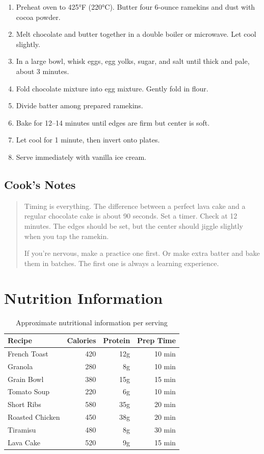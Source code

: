 \documentclass[
    language=english,
    doctype=recipe-book,
    institution=none,
]{../../omnilatex}
\begin{document}
\begin{enumerate}
    \item Preheat oven to 425°F (220°C). Butter four 6-ounce ramekins and dust with cocoa powder.
    \item Melt chocolate and butter together in a double boiler or microwave. Let cool slightly.
    \item In a large bowl, whisk eggs, egg yolks, sugar, and salt until thick and pale, about 3 minutes.
    \item Fold chocolate mixture into egg mixture. Gently fold in flour.
    \item Divide batter among prepared ramekins.
    \item Bake for 12--14 minutes until edges are firm but center is soft.
    \item Let cool for 1 minute, then invert onto plates.
    \item Serve immediately with vanilla ice cream.
\end{enumerate}

\subsection*{Cook's Notes}
\begin{quote}
Timing is everything. The difference between a perfect lava cake and a regular chocolate cake is about 90 seconds. Set a timer. Check at 12 minutes. The edges should be set, but the center should jiggle slightly when you tap the ramekin.

If you're nervous, make a practice one first. Or make extra batter and bake them in batches. The first one is always a learning experience.
\end{quote}

\section*{Nutrition Information}

\begin{table}[h]
\centering
\small
\begin{tabular}{lrrr}
\toprule
\textbf{Recipe} & \textbf{Calories} & \textbf{Protein} & \textbf{Prep Time} \\
\midrule
French Toast & 420 & 12g & 10 min \\
Granola & 280 & 8g & 10 min \\
Grain Bowl & 380 & 15g & 15 min \\
Tomato Soup & 220 & 6g & 10 min \\
Short Ribs & 580 & 35g & 20 min \\
Roasted Chicken & 450 & 38g & 20 min \\
Tiramisu & 480 & 8g & 30 min \\
Lava Cake & 520 & 9g & 15 min \\
\bottomrule
\end{tabular}
\caption{Approximate nutritional information per serving}
\end{table}
\end{document}
